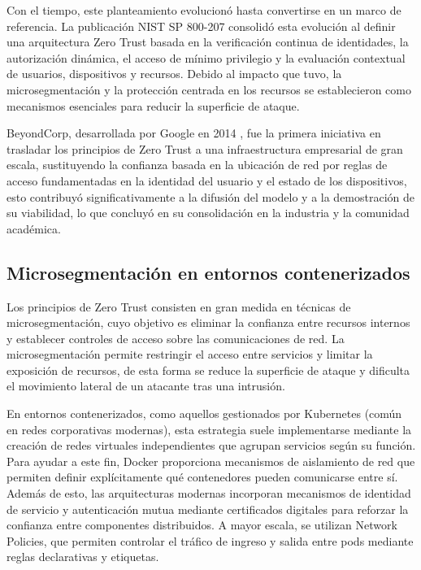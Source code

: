 \documentclass[11pt,spanish,listoffigures,listoftables]{tfgetsinf}
\begin{document}
    Con el tiempo, este planteamiento evolucionó hasta convertirse en un marco de referencia. La publicación NIST SP 800-207 \cite{nist800207} consolidó esta evolución al definir una arquitectura Zero Trust basada en la verificación continua de identidades, la autorización dinámica, el acceso de mínimo privilegio y la evaluación contextual de usuarios, dispositivos y recursos. Debido al impacto que tuvo, la microsegmentación y la protección centrada en los recursos se establecieron como mecanismos esenciales para reducir la superficie de ataque.
    
    BeyondCorp, desarrollada por Google en 2014 \cite{beyondcorp}, fue la primera iniciativa en trasladar los principios de Zero Trust a una infraestructura empresarial de gran escala, sustituyendo la confianza basada en la ubicación de red por reglas de acceso fundamentadas en la identidad del usuario y el estado de los dispositivos, esto contribuyó significativamente a la difusión del modelo y a la demostración de su viabilidad, lo que concluyó en su consolidación en la industria y la comunidad académica.

        \subsection{Microsegmentación en entornos contenerizados}
        \label{sec:2.2.1}
        Los principios de Zero Trust consisten en gran medida en técnicas de microsegmentación, cuyo objetivo es eliminar la confianza entre recursos internos y establecer controles de acceso sobre las comunicaciones de red. La microsegmentación permite restringir el acceso entre servicios y limitar la exposición de recursos, de esta forma se reduce la superficie de ataque y dificulta el movimiento lateral de un atacante tras una intrusión.
        
        En entornos contenerizados, como aquellos gestionados por Kubernetes (común en redes corporativas modernas), esta estrategia suele implementarse mediante la creación de redes virtuales independientes que agrupan servicios según su función. Para ayudar a este fin, Docker proporciona mecanismos de aislamiento de red que permiten definir explícitamente qué contenedores pueden comunicarse entre sí. Además de esto, las arquitecturas modernas incorporan mecanismos de identidad de servicio y autenticación mutua mediante certificados digitales para reforzar la confianza entre componentes distribuidos. A mayor escala, se utilizan Network Policies, que permiten controlar el tráfico de ingreso y salida entre pods mediante reglas declarativas y etiquetas.
\end{document}
